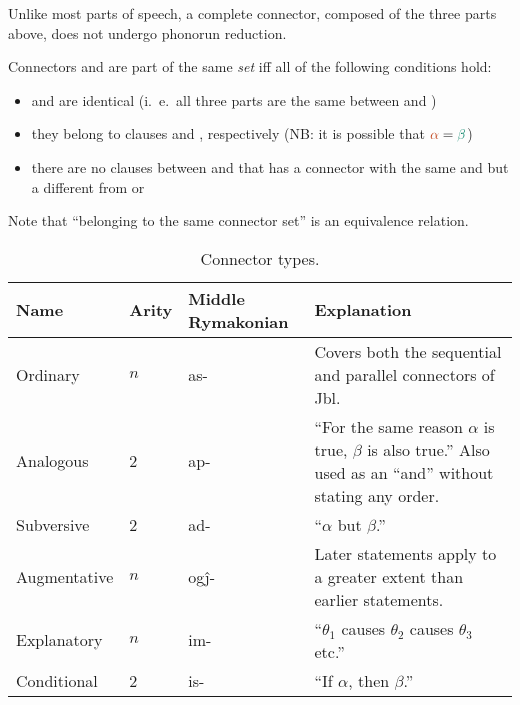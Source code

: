 \documentclass{book}
\newcommand{\lname}{Middle Rymakonian}
\begin{document}
Unlike most parts of speech, a complete connector, composed of the three parts above, does not undergo phonorun reduction.

Connectors  and  are part of the same \emph{set}  iff all of the following conditions hold:

\begin{itemize}
  \item {} and  are identical (i.~e.~all three parts are the same between  and )
  \item they belong to clauses \hlv{$\alpha$} and \hlvi{$\beta$}, respectively (NB: it is possible that $\hlv{\alpha} = \hlvi{\beta}$)
  \item there are no clauses between \hlv{$\alpha$} and \hlvi{$\beta$} that has a connector with the same  and  but a different  from  or 
\end{itemize}

Note that ``belonging to the same connector set'' is an equivalence relation.

\begin{table}[ht]
  \caption{Connector types. \label{table:contypes}}
  \centering
  \begin{tabu} to 
    Name & Arity & \textnormal{\lname} & Explanation \\
    \hline
    Ordinary & $n$ & as- & Covers both the sequential and parallel connectors of Jbl. \\
    Analogous & 2 & ap- & ``For the same reason $\alpha$ is true, $\beta$ is also true.'' Also used as an ``and'' without stating any order. \\
    Subversive & 2 & ad- & ``$\alpha$ but $\beta$.'' \\
    Augmentative & $n$ & og\^j- & Later statements apply to a greater extent than earlier statements. \\
    Explanatory & $n$ & im- & ``$\theta_1$ causes $\theta_2$ causes $\theta_3$ etc.'' \\
    Conditional & 2 & is- & ``If $\alpha$, then $\beta$.'' \\
  \end{tabu}
\end{table}
\end{document}
